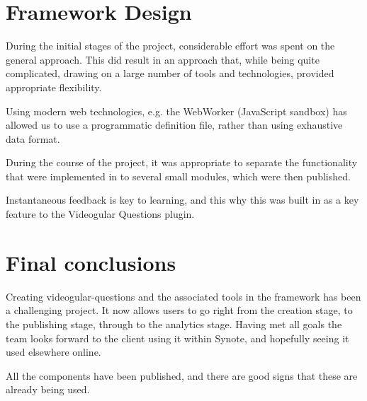 

\section{Framework Design}


During the initial stages of the project, considerable effort was spent on the
general approach. This did result in an approach that, while being quite
complicated, drawing on a large number of tools and technologies, provided
appropriate flexibility.

Using modern web technologies, e.g. the WebWorker (JavaScript sandbox) has
allowed us to use a programmatic definition file, rather than using exhaustive
data format.

During the course of the project, it was appropriate to separate the
functionality that were implemented in to several small modules, which were
then published.

Instantaneous feedback is key to learning, and this why this was built in as a
key feature to the Videogular Questions plugin.

\section{Final conclusions}

Creating videogular-questions and the associated tools in the framework has been a challenging project. It now allows users to go right from the creation
stage, to the publishing stage, through to the analytics stage. Having met all goals the team looks forward to the client using it within Synote, and hopefully seeing it used elsewhere online.

All the components have been published, and there are good signs that these are already being used.


